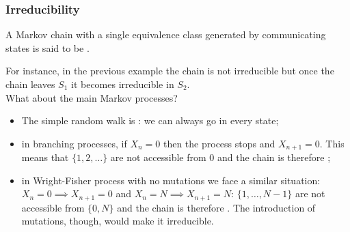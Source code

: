 \documentclass{article}
\begin{document}
	\subsubsection{Irreducibility
	}
	\begin{definition}
		A Markov chain with a single equivalence class generated by communicating states is said to be .
	\end{definition}
	For instance, in the previous example the chain is not irreducible but once the chain leaves $S_1$ it becomes irreducible in $S_2$.\\
	What about the main Markov processes?
	\begin{itemize}
		\item The simple random walk is : we can always go in every state;
		\item in branching processes, if $X_n=0$ then the process stops and $X_{n+1}=0$. This means that $\{1,2,\ldots\}$ are not accessible from 0 and the chain is therefore ;
		\item in Wright-Fisher process with no mutations we face a similar situation: $X_n=0\implies X_{n+1}=0 $ and $X_n=N\implies X_{n+1}=N $: $\{1,\ldots,N-1\}$ are not accessible from $\{0,N\}$ and the chain is therefore . The introduction of mutations, though, would make it irreducible.
	\end{itemize}
	
\end{document}
